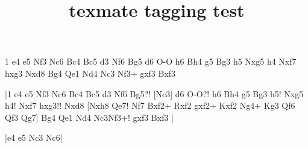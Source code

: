 \documentclass{article}
\title{texmate tagging test}
\begin{document}
\begin{texmate}
1 e4 e5 Nf3 Nc6 Bc4 Bc5 d3 Nf6 Bg5 d6 O-O h6 Bh4 g5 Bg3 h5 Nxg5 h4 Nxf7 hxg3 Nxd8 Bg4 Qe1 Nd4 Nc3 Nf3+ gxf3 Bxf3
\end{texmate}

\newgame
{}

\makegametitle
|1 e4 e5 Nf3 Nc6 Bc4 Bc5 d3 Nf6 Bg5?! [Nc3] d6 O-O?! h6 Bh4 g5 Bg3 h5! Nxg5 h4! Nxf7 hxg3!! Nxd8 [Nxh8 Qe7!  Nf7 Bxf2+ Rxf2 gxf2+ Kxf2 Ng4+ Kg3 Qf6 Qf3 Qg7\BBetter] Bg4 Qe1 Nd4 Nc3 Nf3+! gxf3 Bxf3 \resigns|

\newgame
|e4 e5 Nc3 Nc6\toD*|
\nodiagrammove
\makediagrams
\end{document}
